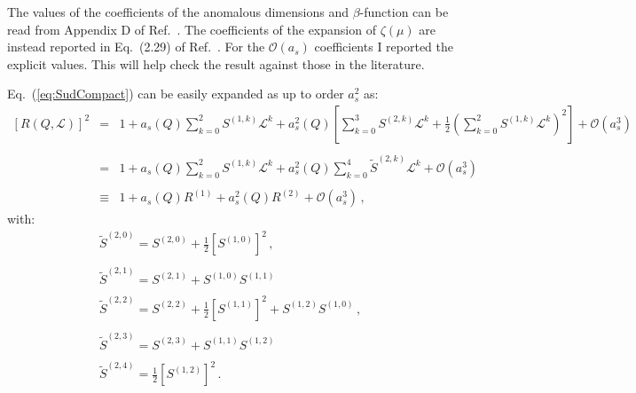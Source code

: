 \documentclass[10pt,a4paper]{article}
\begin{document}
The values of the coefficients of the anomalous dimensions and
$\beta$-function can be read from Appendix D of
Ref.~\cite{Echevarria:2016scs}. The coefficients of the expansion of
$\zeta(\mu)$ are instead reported in Eq.~(2.29) of
Ref.~\cite{Scimemi:2017etj}. For the $\mathcal{O}(a_s)$ coefficients I
reported the explicit values. This will help check the result against
those in the literature.

Eq.~(\ref{eq:SudCompact}) can be easily expanded as up to order
$a_s^2$ as:
\begin{equation}\label{eq:exp1}
\begin{array}{rcl}
  \displaystyle \left[R(Q,\mathcal{L})\right]^2&=&\displaystyle
                                         1+a_s(Q)\sum_{k=0}^{2}S^{(1,k)}\mathcal{L}^k+a_s^2(Q)\left[\sum_{k=0}^{3}S^{(2,k)}\mathcal{L}^k+\frac12\left(\sum_{k=0}^{2}S^{(1,k)}\mathcal{L}^k\right)^2\right]+\mathcal{O}(a_s^3)\\
  \\
                                     &=&\displaystyle
                                         1+a_s(Q)\sum_{k=0}^{2}S^{(1,k)}\mathcal{L}^k+a_s^2(Q)
                                         \sum_{k=0}^{4}\widetilde{S}^{(2,k)}\mathcal{L}^k
                                         +\mathcal{O}(a_s^3)\\
\\
&\equiv&\displaystyle  1+a_s(Q)R^{(1)}+a_s^2(Q)
                                         R^{(2)}+\mathcal{O}(a_s^3)\,,
\end{array}
\end{equation}
with:
\begin{equation}
\begin{array}{l}
\displaystyle  \widetilde{S}^{(2,0)}={S}^{(2,0)}+\frac12
  \left[S^{(1,0)}\right]^2\,,\\
  \\
\displaystyle    \widetilde{S}^{(2,1)}={S}^{(2,1)}+{S}^{(1,0)}{S}^{(1,1)}\\
\\
\displaystyle    \widetilde{S}^{(2,2)}={S}^{(2,2)}+\frac12 \left[S^{(1,1)}\right]^2+{S}^{(1,2)}{S}^{(1,0)}\,,\\
\\
\displaystyle   \widetilde{S}^{(2,3)}={S}^{(2,3)}+{S}^{(1,1)}{S}^{(1,2)}\\
\\
\displaystyle    \widetilde{S}^{(2,4)}=\frac12 \left[S^{(1,2)}\right]^2\,.
\end{array}
\end{equation}
\end{document}
